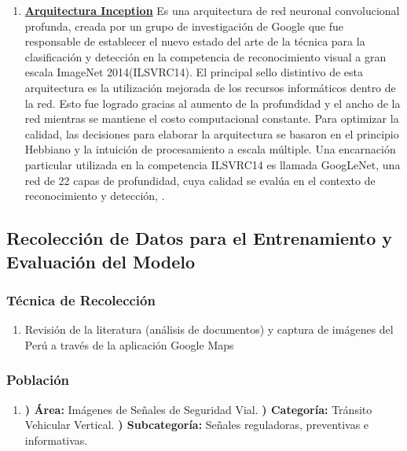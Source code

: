 		\begin{enumerate}
		\item[] {\bf \underline {Arquitectura Inception}}\newline
			Es una arquitectura de red neuronal convolucional profunda, creada por un grupo de investigación de Google que fue responsable de establecer el nuevo estado del arte de la técnica para la clasificación y detección en la competencia de reconocimiento visual a gran escala ImageNet 2014(ILSVRC14). 
			\vskip 0.1cm
			El principal sello distintivo de esta arquitectura es la utilización mejorada de los recursos informáticos dentro de la red. Esto fue logrado gracias al aumento de la profundidad y el ancho de la red mientras se mantiene el costo computacional constante. Para optimizar la calidad, las decisiones para elaborar la arquitectura se basaron en el principio Hebbiano y la intuición de procesamiento a escala múltiple. Una encarnación particular utilizada en la competencia ILSVRC14 es llamada GoogLeNet, una red de 22 capas de profundidad, cuya calidad se evalúa en el contexto de reconocimiento y detección, \citep{Inception}.
		\end{enumerate}

	\subsection{Recolección de Datos para el Entrenamiento y Evaluación del Modelo}
		
		\subsubsection{Técnica de Recolección}
		\begin{enumerate}		
			\item[]  Revisión de la literatura (análisis de documentos) y captura de imágenes del Perú a través de la aplicación Google Maps
		\end{enumerate}

		\subsubsection{Población} 
		\begin{enumerate}
		\item[]				
		{\bf *) Área:} Imágenes de Señales de Seguridad Vial.\vskip 0.1cm
		{\bf *) Categoría:} Tránsito Vehicular Vertical.\vskip 0.1cm
		{\bf *) Subcategoría:} Señales reguladoras, preventivas e informativas.\vskip 0.1cm
		\end{enumerate}

